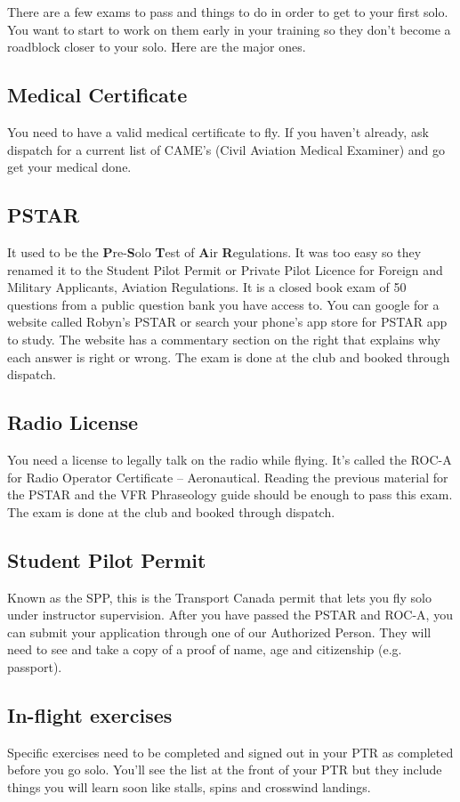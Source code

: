 \documentclass[12pt,letterpaper]{article}
\begin{document}
    There are a few exams to pass and things to do in order to get to your first solo. You want to start to work on them early in your training so they don't become a roadblock closer to your solo. Here are the major ones.
    
    \subsection{Medical Certificate}
    You need to have a valid medical certificate to fly. If you haven't already, ask dispatch for a current list of CAME's (Civil Aviation Medical Examiner) and go get your medical done.
        
    \subsection{PSTAR}
    It used to be the \textbf{P}re-\textbf{S}olo \textbf{T}est of \textbf{A}ir \textbf{R}egulations. It was too easy so they renamed it to the Student Pilot Permit or Private Pilot Licence for Foreign and Military Applicants, Aviation Regulations. It is a closed book exam of 50 questions from a public question bank you have access to. You can google for a website called Robyn's PSTAR or search your phone's app store for PSTAR app to study. The website has a commentary section on the right that explains why each answer is right or wrong. The exam is done at the club and booked through dispatch.
        
    \subsection{Radio License}
    You need a license to legally talk on the radio while flying. It's called the ROC-A for Radio Operator Certificate -- Aeronautical. Reading the previous material for the PSTAR and the VFR Phraseology guide should be enough to pass this exam. The exam is done at the club and booked through dispatch.

    \subsection{Student Pilot Permit}
    Known as the SPP, this is the Transport Canada permit that lets you fly solo under instructor supervision. After you have passed the PSTAR and ROC-A, you can submit your application through one of our Authorized Person. They will need to see and take a copy of a proof of name, age and citizenship (e.g. passport).
    
    \subsection{In-flight exercises}
    Specific exercises need to be completed and signed out in your PTR as completed before you go solo. You'll see the list at the front of your PTR but they include things you will learn soon like stalls, spins and crosswind landings.

\newpage
\begin{versionhistory}
\end{versionhistory}
\end{document}
